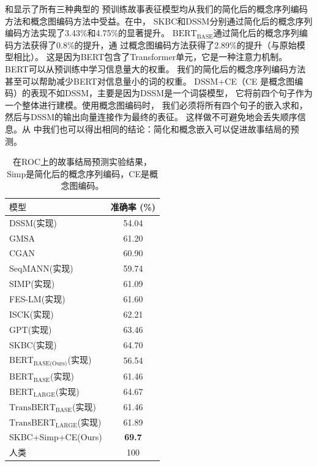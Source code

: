 \begin{table}
\small
\centering
{}
\caption{在$ROC_v1.5$测试集上应用简化后的概念序列编码和概念图编码方法的端到端准确率。}
\label{tab2:main1.5}
\end{table}

和显示了所有三种典型的
预训练故事表征模型均从我们的简化后的概念序列编码方法和概念图编码方法中受益。在中，
SKBC和DSSM分别通过简化后的概念序列编码方法实现了3.43\%和4.75\%的显著提升。
$\text{BERT}_{\text{BASE}}$通过简化后的概念序列编码方法获得了0.8\%的提升，通
过概念图编码方法获得了2.89\%的提升（与原始模型相比）。
这是因为BERT包含了Transformer单元，它是一种注意力机制。
BERT可以从预训练中学习信息量大的权重。
我们的简化后的概念序列编码方法甚至可以帮助减少BERT对信息量小的词的权重。
DSSM+CE（CE 是概念图编码）的表现不如DSSM，主要是因为DSSM是一个词袋模型，
它将前四个句子作为一个整体进行建模。使用概念图编码时，
我们必须将所有四个句子的嵌入求和，
然后与DSSM的输出向量连接作为最终的表征。
这样做不可避免地会丢失顺序信息。从
中我们也可以得出相同的结论：简化和概念嵌入可以促进故事结局的预测。

\begin{table}
\small
\centering
\begin{tabular}{lc}
\toprule
$\textbf{模型}$ & 准确率 (\%)\\
\midrule
DSSM(实现)& 54.04\\
GMSA& 61.20\\
CGAN& 60.90 \\
SeqMANN(实现)& 59.74\\
SIMP(实现)&61.09\\
FES-LM(实现)&61.60\\
ISCK(实现)& 62.21 \\
GPT(实现)& 63.46\\
SKBC(实现)&64.70\\
$\text{BERT}_{\text{BASE(Ours)}}$(实现)&56.54\\
$\text{BERT}_{\text{BASE}}$(实现)&61.46\\
$\text{BERT}_{\text{LARGE}}$(实现)&64.67\\
$\text{TransBERT}_{\text{BASE}}$(实现)&61.46\\
$\text{TransBERT}_{\text{LARGE}}$(实现)&61.89\\
\midrule
SKBC+Simp+CE(Ours)&\bf{69.7}\\
\midrule
人类& 100\\
\bottomrule
\end{tabular}
\caption{在ROC上的故事结局预测实验结果，Simp是简化后的概念序列编码，CE是概念图编码。}
\label{tab2:all-models}
\end{table}

